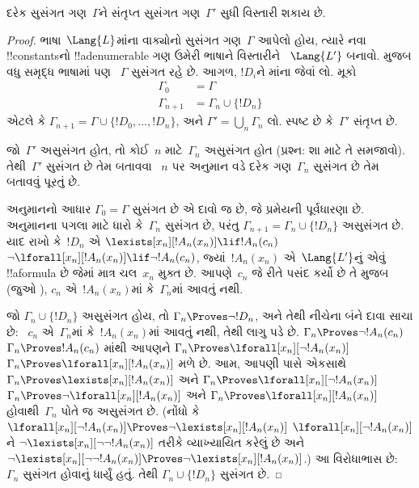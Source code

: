 \documentclass[../../../include/open-logic-section]{subfiles}
\begin{document}
\begin{lem}
દરેક સુસંગત ગણ~$\Gamma$ને સંતૃપ્ત સુસંગત ગણ~$\Gamma'$ સુધી વિસ્તારી
શકાય છે.
\end{lem}

\begin{proof}
ભાષા~$\Lang{L}$માંના વાક્યોનો સુસંગત ગણ~$\Gamma$ આપેલો હોય, ત્યારે
નવા !!{constant}sનો !!a{denumerable} ગણ ઉમેરી ભાષાને વિસ્તારીને
~$\Lang{L'}$ બનાવો.  મુજબ વધુ સમૃદ્ધ ભાષામાં પણ
~$\Gamma$ સુસંગત રહે છે. આગળ, $!D_i$ને માંના
જેવાં લો. મૂકો
\begin{align*}
\Gamma_0 & = \Gamma \\
\Gamma_{n+1} & = \Gamma_n \cup \{!D_n \}
\end{align*}
એટલે કે $\Gamma_{n+1}=\Gamma\cup\{!D_0,\dots,!D_n\}$, અને
$\Gamma'=\bigcup_{n}\Gamma_n$ લો. સ્પષ્ટ છે કે~$\Gamma'$ સંતૃપ્ત છે.

જો~$\Gamma'$ અસુસંગત હોત, તો કોઈ~$n$ માટે~$\Gamma_n$ અસુસંગત હોત
(પ્રશ્ન: શા માટે તે સમજાવો). તેથી~$\Gamma'$ સુસંગત છે તેમ બતાવવા
~$n$ પર અનુમાન વડે દરેક ગણ~$\Gamma_n$ સુસંગત છે તેમ બતાવવું પૂરતું છે.

અનુમાનનો આધાર $\Gamma_0=\Gamma$ સુસંગત છે એ દાવો જ છે, જે પ્રમેયની
પૂર્વધારણા છે. અનુમાનના પગલા માટે ધારો કે~$\Gamma_{n}$ સુસંગત છે, પરંતુ
$\Gamma_{n+1}=\Gamma_n\cup\{!D_n\}$ અસુસંગત છે. યાદ રાખો કે~$!D_n$ એ
{$\lexists[x_{n}][!A_{n}(x_n)] \lif !A_{n}(c_{n})$}
{$\lnot\lforall[x_{n}][!A_{n}(x_n)] \lif \lnot !A_{n}(c_{n})$},
જ્યાં~$!A_n(x_n)$ એ~$\Lang{L'}$નું એવું !!a{formula} છે જેમાં માત્ર
ચલ~$x_n$ મુક્ત છે. આપણે~$c_n$ જે રીતે પસંદ કર્યો છે તે મુજબ (જુઓ
), $c_n$ એ~$!A_n(x_n)$માં કે~$\Gamma_n$માં
આવતું નથી.

જો $\Gamma_n\cup\{!D_n\}$ અસુસંગત હોય, તો $\Gamma_n\Proves\lnot
!D_n$, અને તેથી નીચેના બંને દાવા સાચા છે:
~$c_n$ એ~$\Gamma_n$માં કે~$!A_n(x_n)$માં આવતું નથી, તેથી
લાગુ પડે છે.
{$\Gamma_n \Proves \lnot !A_n(c_n)$}
{$\Gamma_n \Proves !A_n(c_n)$}
માંથી આપણને
{$\Gamma_n \Proves \lforall[x_n][\lnot !A_n(x_n)]$}
{$\Gamma_n \Proves \lforall[x_n][!A_n(x_n)]$}
મળે છે. આમ, આપણી પાસે એકસાથે
{$\Gamma_n \Proves \lexists[x_n][!A_n(x_n)]$ અને
$\Gamma_n \Proves \lforall[x_n][\lnot !A_n(x_n)]$}
{$\Gamma_n \Proves \lnot\lforall[x_n][!A_n(x_n)]$ અને
$\Gamma_n \Proves \lforall[x_n][!A_n(x_n)]$}
હોવાથી~$\Gamma_n$ પોતે જ અસુસંગત છે.
{(નોંધો કે
{$\lforall[x_n][\lnot !A_n(x_n)] \Proves
  \lnot\lexists[x_n][!A_n(x_n)]$}
{$\lforall[x_n][\lnot !A_n(x_n)]$ને
  $\lnot\lexists[x_n][\lnot\lnot !A_n(x_n)]$ તરીકે વ્યાખ્યાયિત કરેલું
  છે અને
  $\lnot\lexists[x_n][\lnot\lnot !A_n(x_n)] \Proves
  \lnot\lexists[x_n][!A_n(x_n)]$}.)}{}
આ વિરોધાભાસ છે:~$\Gamma_n$ સુસંગત હોવાનું ધાર્યું હતું. તેથી
$\Gamma_n\cup\{!D_n\}$ સુસંગત છે.
\end{proof}
\end{document}
